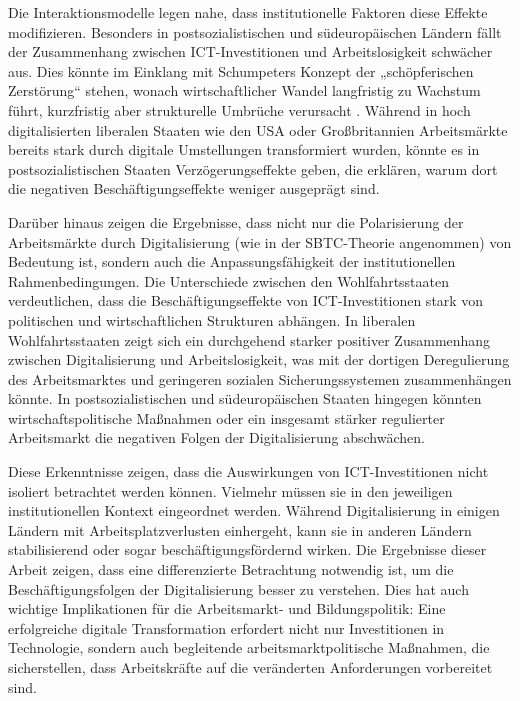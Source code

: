 Die Interaktionsmodelle legen nahe, dass institutionelle Faktoren diese Effekte 
modifizieren. Besonders in postsozialistischen und südeuropäischen Ländern fällt der 
Zusammenhang zwischen \ac{ICT}-Investitionen und Arbeitslosigkeit schwächer aus. Dies 
könnte im Einklang mit Schumpeters Konzept der „schöpferischen Zerstörung“ stehen, 
wonach wirtschaftlicher Wandel langfristig zu Wachstum führt, kurzfristig aber 
strukturelle Umbrüche verursacht \parencite[vgl.][S. 81–86]{schumpeter1976capitalism}. 
Während in hoch digitalisierten liberalen Staaten wie den USA oder Großbritannien 
Arbeitsmärkte bereits stark durch digitale Umstellungen transformiert wurden, könnte es 
in postsozialistischen Staaten Verzögerungseffekte geben, die erklären, warum dort die 
negativen Beschäftigungseffekte weniger ausgeprägt sind.

Darüber hinaus zeigen die Ergebnisse, dass nicht nur die Polarisierung der 
Arbeitsmärkte durch Digitalisierung (wie in der \ac{SBTC}-Theorie angenommen) von 
Bedeutung ist, sondern auch die Anpassungsfähigkeit der institutionellen 
Rahmenbedingungen. Die Unterschiede zwischen den Wohlfahrtsstaaten verdeutlichen, dass 
die Beschäftigungseffekte von \ac{ICT}-Investitionen stark von politischen und 
wirtschaftlichen Strukturen abhängen. In liberalen Wohlfahrtsstaaten zeigt sich ein 
durchgehend starker positiver Zusammenhang zwischen Digitalisierung und 
Arbeitslosigkeit, was mit der dortigen Deregulierung des Arbeitsmarktes und geringeren 
sozialen Sicherungssystemen zusammenhängen könnte. In postsozialistischen und 
südeuropäischen Staaten hingegen könnten wirtschaftspolitische Maßnahmen oder ein 
insgesamt stärker regulierter Arbeitsmarkt die negativen Folgen der Digitalisierung 
abschwächen.

Diese Erkenntnisse zeigen, dass die Auswirkungen von \ac{ICT}-Investitionen nicht 
isoliert betrachtet werden können. Vielmehr müssen sie in den jeweiligen 
institutionellen Kontext eingeordnet werden. Während Digitalisierung in einigen Ländern 
mit Arbeitsplatzverlusten einhergeht, kann sie in anderen Ländern stabilisierend oder 
sogar beschäftigungsfördernd wirken. Die Ergebnisse dieser Arbeit zeigen, dass eine 
differenzierte Betrachtung notwendig ist, um die Beschäftigungsfolgen der Digitalisierung 
besser zu verstehen. Dies hat auch wichtige Implikationen für die Arbeitsmarkt- und 
Bildungspolitik: Eine erfolgreiche digitale Transformation erfordert nicht nur 
Investitionen in Technologie, sondern auch begleitende arbeitsmarktpolitische Maßnahmen, 
die sicherstellen, dass Arbeitskräfte auf die veränderten Anforderungen vorbereitet sind.

